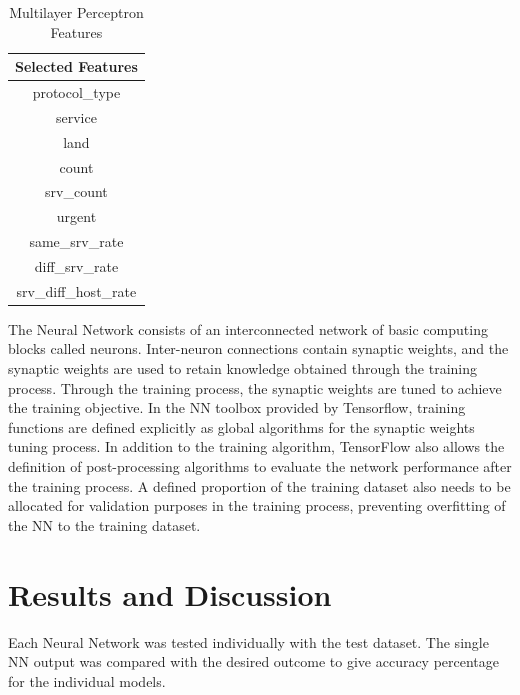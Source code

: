 \documentclass[12pt]{article}
\theoremstyle{definition}
\begin{document}
		\begin{table}[h!]
			\centering
			\caption{Multilayer Perceptron Features}
			\label{tab:model-1-features}
			\begin{tabular}{|c|}
				\hline
				\bfseries{Selected Features} \\ \hline
				protocol\_type \\
				service \\
				land \\
				count \\
				srv\_count \\
				urgent \\
				same\_srv\_rate \\
				diff\_srv\_rate \\
				srv\_diff\_host\_rate \\
				\hline	
			\end{tabular}
			
		\end{table}
		The Neural Network consists of an interconnected network of basic computing blocks called
		neurons. Inter-neuron connections contain synaptic weights, and the synaptic weights are
		used to retain knowledge obtained through the training process. Through the training
		process, the synaptic weights are tuned to achieve the training objective. In the NN
		toolbox provided by Tensorflow, training functions are defined explicitly as global
		algorithms for the synaptic weights tuning process. In addition to the training algorithm,
		TensorFlow also allows the definition of post-processing algorithms to evaluate the
		network performance after the training process. A defined proportion of the training
		dataset also needs to be allocated for validation purposes in the training process,
		preventing overfitting of the NN to the training dataset.
	
		
			
			
			
	
	\cleardoublepage
	\section{Results and Discussion}
	Each Neural Network was tested individually with the test dataset. The single NN output was compared with the desired outcome to give accuracy percentage for the individual models.
		
\end{document}
